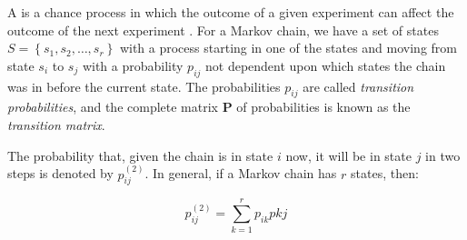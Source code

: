 A  is a chance process in which the outcome of a given
experiment can affect the outcome of the next experiment \cite{Grinstead:1997}. 
For a Markov chain, we have a set of states $S = \left\{ s_{1}, s_{2}, \ldots, 
s_{r} \right\}$ with a process starting in one of the states and moving from 
state $s_{i}$ to $s_{j}$ with a probability $p_{ij}$ not dependent upon which 
states the chain was in before the current state. The probabilities $p_{ij}$ are
called \emph{transition probabilities}, and the complete matrix $\mathbf{P}$ of 
probabilities is known as the \emph{transition matrix}.

The probability that, given the chain is in state $i$ now, it will be in state 
$j$ in two steps is denoted by $p_{ij}^{(2)}$. In general, if a Markov chain has 
$r$ states, then:

\begin{equation}
p_{ij}^{(2)} = \sum_{k=1}^{r} p_{ik}p{kj}
\end{equation}
